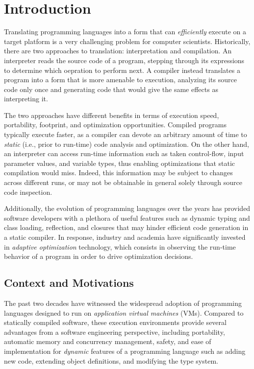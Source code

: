 
\chapter{Introduction}

Translating programming languages into a form that can {\em efficiently} execute on a target platform is a very challenging problem for computer scientists. Historically, there are two approaches to translation: interpretation and compilation. An interpreter reads the source code of a program, stepping through its expressions to determine which oepration to perform next. A compiler instead translates a program into a form that is more amenable to execution, analyzing its source code only once and generating code that would give the same effects as interpreting it.

The two approaches have different benefits in terms of execution speed, portability, footprint, and optimization opportunities. Compiled programs typically execute faster, as a compiler can devote an arbitrary amount of time to {\em static} (i.e., prior to run-time) code analysis and optimization. On the other hand, an interpreter can access run-time information such as taken control-flow, input parameter values, and variable types, thus enabling optimizations that static compilation would miss. Indeed, this information may be subject to changes across different runs, or may not be obtainable in general solely through source code inspection.

Additionally, the evolution of programming languages over the years has provided software developers with a plethora of useful features such as dynamic typing and class loading, reflection, and closures that may hinder efficient code generation in a static compiler. In response, industry and academia have significantly invested in {\em adaptive optimization} technology, which consists in observing the run-time behavior of a program in order to drive optimization decisions.

\section{Context and Motivations}

The past two decades have witnessed the widespread adoption of programming languages designed to run on {\em application virtual machines} (VMs). Compared to statically compiled software, these execution environments provide several advantages from a software engineering perspective, including portability, automatic memory and concurrency management, safety, and ease of implementation for {\em dynamic} features of a programming language such as adding new code, extending object definitions, and modifying the type system.


